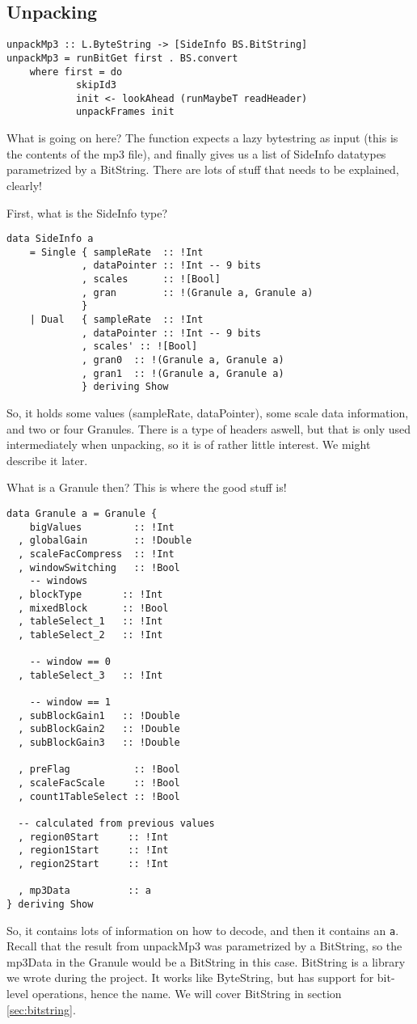 \documentclass[a4paper,12pt]{article}
\begin{document}
    \subsection{Unpacking}

    \begin{lstlisting}
unpackMp3 :: L.ByteString -> [SideInfo BS.BitString]
unpackMp3 = runBitGet first . BS.convert
    where first = do
            skipId3
            init <- lookAhead (runMaybeT readHeader)
            unpackFrames init
    \end{lstlisting}
    What is going on here? The function expects a lazy bytestring as input (this
    is the contents of the mp3 file), and finally gives us a list of SideInfo
    datatypes parametrized by a BitString. There are lots of stuff that needs to
    be explained, clearly!
    
    First, what is the SideInfo type?
    \begin{lstlisting}
data SideInfo a
    = Single { sampleRate  :: !Int
             , dataPointer :: !Int -- 9 bits
             , scales      :: ![Bool]
             , gran        :: !(Granule a, Granule a)
             }
    | Dual   { sampleRate  :: !Int
             , dataPointer :: !Int -- 9 bits
             , scales' :: ![Bool]
             , gran0  :: !(Granule a, Granule a)
             , gran1  :: !(Granule a, Granule a)
             } deriving Show
    \end{lstlisting}
    So, it holds some values (sampleRate, dataPointer), some scale data
    information, and two or four Granules. There is a type of headers aswell,
    but that is only used intermediately when unpacking, so it is of rather
    little interest. We might describe it later.

    What is a Granule then? This is where the good stuff is!
    \begin{lstlisting}
data Granule a = Granule {
    bigValues         :: !Int
  , globalGain        :: !Double
  , scaleFacCompress  :: !Int
  , windowSwitching   :: !Bool
    -- windows
  , blockType       :: !Int
  , mixedBlock      :: !Bool
  , tableSelect_1   :: !Int
  , tableSelect_2   :: !Int

    -- window == 0
  , tableSelect_3   :: !Int

    -- window == 1
  , subBlockGain1   :: !Double
  , subBlockGain2   :: !Double
  , subBlockGain3   :: !Double

  , preFlag           :: !Bool
  , scaleFacScale     :: !Bool
  , count1TableSelect :: !Bool

  -- calculated from previous values
  , region0Start     :: !Int
  , region1Start     :: !Int
  , region2Start     :: !Int

  , mp3Data          :: a
} deriving Show
    \end{lstlisting}
    So, it contains lots of information on how to decode, and then it contains
    an \texttt{a}. Recall that the result from unpackMp3 was parametrized by a
    BitString, so the mp3Data in the Granule would be a BitString in this case.
    BitString is a library we wrote during the project. It works like
    ByteString, but has support for bit-level operations, hence the name. We
    will cover BitString in section \ref{sec:bitstring}.
\end{document}

